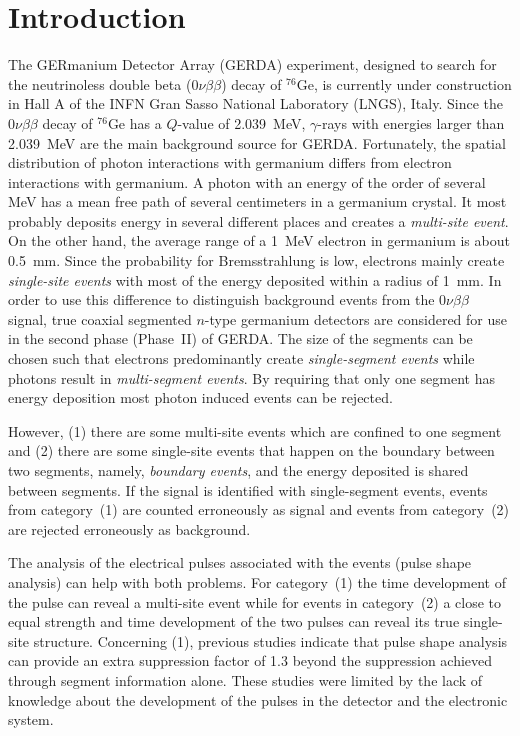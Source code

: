 \documentclass[epj]{svjour}
\begin{document}
\section{Introduction}
\label{s:intro}
The GERmanium Detector Array (GERDA) experiment, designed to search
for the neutrinoless double beta ($0\nu\beta\beta$) decay of
$^{76}$Ge, is currently under construction in Hall A of the INFN Gran
Sasso National Laboratory (LNGS), Italy. \cite{Abt04,Sch05} Since the
$0\nu\beta\beta$ decay of $^{76}$Ge has a $Q$-value of 2.039~MeV,
$\gamma$-rays with energies larger than 2.039~MeV are the main
background source for GERDA. Fortunately, the spatial distribution of
photon interactions with germanium differs from electron interactions
with germanium. A photon with an energy of the order of several MeV
has a mean free path of several centimeters in a germanium crystal. It
most probably deposits energy in several different places and creates
a \emph{multi-site event}. On the other hand, the average range of a
1~MeV electron in germanium is about 0.5~mm. Since the probability for
Bremsstrahlung is low, electrons mainly create \emph{single-site
events} with most of the energy deposited within a radius of 1~mm. In
order to use this difference to distinguish background events from the
$0\nu\beta\beta$ signal, true coaxial segmented $n$-type germanium
detectors are considered for use in the second phase (Phase~II) of
GERDA. The size of the segments can be chosen such that electrons
predominantly create \emph{single-segment events} while photons result
in \emph{multi-segment events}. By requiring that only one segment has
energy deposition most photon induced events can be
rejected. \cite{photon}

However, (1) there are some multi-site events which are confined to
one segment and (2) there are some single-site events that happen on
the boundary between two segments, namely, \textit{boundary events},
and the energy deposited is shared between segments. If the signal is
identified with single-segment events, events from category~(1) are
counted erroneously as signal and events from category~(2) are
rejected erroneously as background.

The analysis of the electrical pulses associated with the events
(pulse shape analysis) can help with both problems. For category~(1)
the time development of the pulse can reveal a multi-site event while
for events in category~(2) a close to equal strength and time
development of the two pulses can reveal its true single-site
structure. Concerning (1), previous studies \cite{psa} indicate that
pulse shape analysis can provide an extra suppression factor of 1.3
beyond the suppression achieved through segment information
alone. These studies were limited by the lack of knowledge about the
development of the pulses in the detector and the electronic system.
\end{document}
